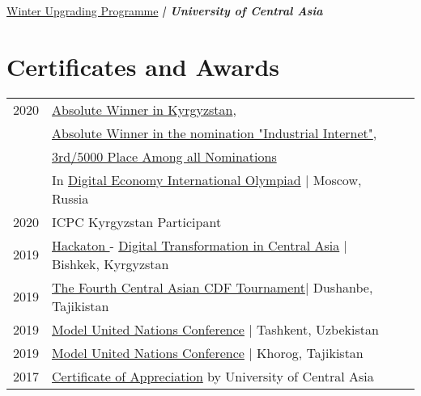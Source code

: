 \documentclass[]{deedy-resume-openfont}
\begin{document}
\begin{minipage}[t]{0.59\textwidth}
\href{https://www.akdn.org/our-agencies/university-central-asia/uca-pre-university-education}{Winter Upgrading Programme} 
{\footnotesize \textit{\textbf{| University of Central Asia}}} \\


\section{Certificates and Awards} 
\begin{tabular}{rll}

2020 & \href{https://drive.google.com/file/d/1qWr5qT-tAZjzCQhJVwCS_91mZGf8PeEm/view?usp=sharing}{Absolute Winner in Kyrgyzstan},\\& \href{https://drive.google.com/file/d/1qWr5qT-tAZjzCQhJVwCS_91mZGf8PeEm/view?usp=sharing}{Absolute Winner in the nomination "Industrial Internet"},\\
&\href{https://drive.google.com/file/d/1qWr5qT-tAZjzCQhJVwCS_91mZGf8PeEm/view?usp=sharing}{3rd/5000 Place Among all Nominations}\\
&In \href{http://rdcu.ru/olympdigitaleconomyworld_eng}{Digital Economy International Olympiad} \space| Moscow, Russia\\
2020& ICPC Kyrgyzstan Participant\\

2019&\href{https://drive.google.com/file/d/1oHNS00dwOLS9y1tmq42F8RWxjM2WjFL0/view?usp=sharing}{Hackaton } - \href{https://dtca.kg/}{Digital Transformation in Central Asia} | Bishkek, Kyrgyzstan\\

2019& \href{https://drive.google.com/file/d/1nfR0Lww5Qxti6asNj6nNwK0REmB7b0E8/view?usp=sharing}{The Fourth Central Asian CDF Tournament}| Dushanbe, Tajikistan\\

2019& \href{https://drive.google.com/file/d/1nmrnoNYaSuMe-eunNoyV0LAmya0OgE-D/view?usp=sharing}{Model United Nations Conference} \space | Tashkent, Uzbekistan\\

2019& \href{https://drive.google.com/file/d/1o-GMVCzRXZHLrqYimTdKvgOYd2RdAMj_/view?usp=sharing}{Model United Nations Conference} \space | Khorog, Tajikistan\\

2017& \href{https://drive.google.com/file/d/1o7lv1Rfxlw0AxtvmmHWzMXZlWjPb8xUj/view?usp=sharing}{Certificate of Appreciation} by University of Central Asia\\


\end{tabular}
\end{minipage}
\end{document}
